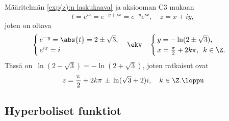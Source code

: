 Määritelmän \eqref{exp(z):n laskukaava} ja aksiooman C3 mukaan
\[
t=e^{iz} = e^{-y+ix} = e^{-y}e^{ix}, \quad z=x+iy,
\]
joten on oltava
\[
\begin{cases} \,e^{-y}=\abs{t}=2\pm\sqrt{3}, \\ \,e^{ix}=i  \end{cases} \ekv\quad
\begin{cases} \,y=-\ln(2\pm\sqrt{3}), \\ \,x=\frac{\pi}{2}+2k\pi,\,\ k\in\Z. \end{cases}
\]
Tässä on $\,\ln(2-\sqrt{3})=-\ln(2+\sqrt{3})$, joten ratkaisut ovat
\[ 
z= \frac{\pi}{2}+2k\pi\,\pm\,\ln(\sqrt{3}+2)i, \quad k\in\Z. \loppu
\]

\subsection*{Hyperboliset funktiot}

